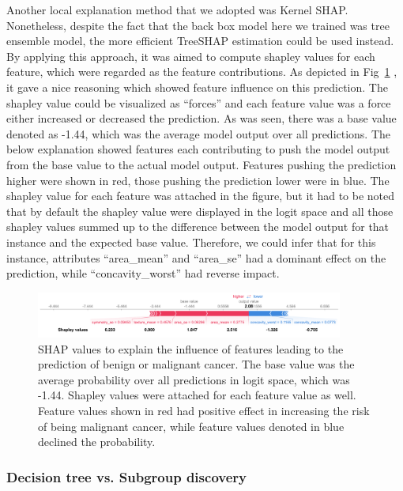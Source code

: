 Another local explanation method that we adopted was Kernel SHAP. Nonetheless, despite the fact that the back box model here we trained was tree ensemble model, the more efficient TreeSHAP estimation could be used instead. By applying this approach, it was aimed to compute shapley values for each feature, which were regarded as the feature contributions. As depicted in Fig~\ref{fig:breast_shap} , it gave a nice reasoning which showed feature influence on this prediction. The shapley value could be visualized as “forces” and each feature value was a force either increased or decreased the prediction. As was seen, there was a base value denoted as -1.44, which was the average model output over all predictions. The below explanation showed features each contributing to push the model output from the base value to the actual model output. Features pushing the prediction higher were shown in red, those pushing the prediction lower were in blue. The shapley value for each feature was attached in the figure, but it had to be noted that by default the shapley value were displayed in the logit space and all those shapley values summed up to the difference between the model output for that instance and the expected base value. Therefore, we could infer that for this instance, attributes “area\_mean” and “area\_se” had a dominant effect on the prediction, while “concavity\_worst” had reverse impact. 

\begin{figure}[H]
	\includegraphics[width=0.9\textwidth]{imgs/breast_shap_force_plot.png}
	\caption{SHAP values to explain the influence of features leading to the prediction of benign or malignant cancer. The base value was the average probability over all predictions in logit space, which was -1.44. Shapley values were attached for each feature value as well. Feature values shown in red had positive effect in increasing the risk of being malignant cancer, while feature values denoted in blue declined the probability.}
	\label{fig:breast_shap}
\end{figure}

\subsubsection{Decision tree vs. Subgroup discovery}

